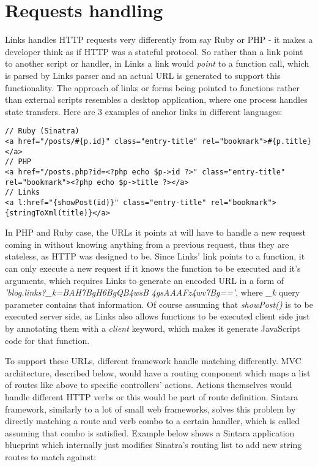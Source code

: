 \section{Requests handling}

Links handles HTTP requests very differently from say Ruby or PHP - it makes a developer think as if HTTP was a stateful protocol. So rather than a link point to another script or handler, in Links a link would \textit{point} to a function call, which is parsed by Links parser and an actual URL is generated to support this functionality. The approach of links or forms being pointed to functions rather than external scripts resembles a desktop application, where one process handles state transfers. Here are 3 examples of anchor links in different languages:

\begin{codelisting}
\begin{verbatim}
// Ruby (Sinatra)
<a href="/posts/#{p.id}" class="entry-title" rel="bookmark">#{p.title}</a>
// PHP
<a href="/posts.php?id=<?php echo $p->id ?>" class="entry-title" rel="bookmark"><?php echo $p->title ?></a>
// Links
<a l:href="{showPost(id)}" class="entry-title" rel="bookmark">{stringToXml(title)}</a>
\end{verbatim}
\end{codelisting}

In PHP and Ruby case, the URLs it points at will have to handle a new request coming in without knowing anything from a previous request, thus they are stateless, as HTTP was designed to be. Since Links' link points to a function, it can only execute a new request if it knows the function to be executed and it's arguments, which requires Links to generate an encoded URL in a form of \textit{'blog.links?\_k=BAH7BgH6BgQB4wsB 4gsAAAFz4wv7Bg=='}, where \textit{\_k} query parameter contains that information. Of course assuming that \textit{showPost()} is to be executed server side, as Links also allows functions to be executed client side just by annotating them with a \textit{client} keyword, which makes it generate JavaScript code for that function.

To support these URLs, different framework handle matching differently. MVC architecture, described below, would have a routing component which maps a list of routes like above to specific controllers' actions. Actions themselves would handle different HTTP verbs or this would be part of route definition. Sintara framework, similarly to a lot of small web frameworks, solves this problem by directly matching a route and verb combo to a certain handler, which is called assuming that combo is satisfied. Example below shows a Sintara application blueprint which internally just modifies Sinatra's routing list to add new string routes to match against:

